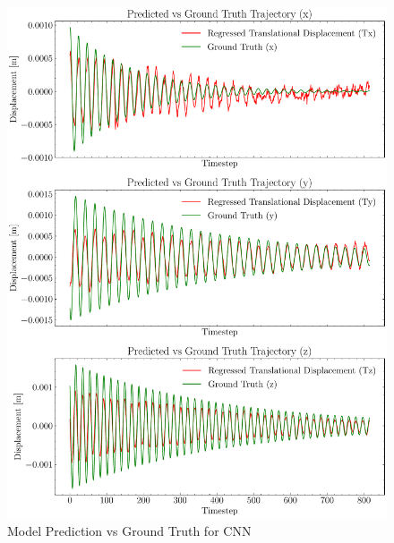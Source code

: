 \begin{figure}[H]
    \centering
    \includegraphics[scale=0.6]{images/fig_chapter4/nn_related/predicted_vs_ground_truth_cnn.pdf}
    \caption{Model Prediction vs Ground Truth for CNN}
    \label{fig:cnn_op_vs_gt}
\end{figure}

